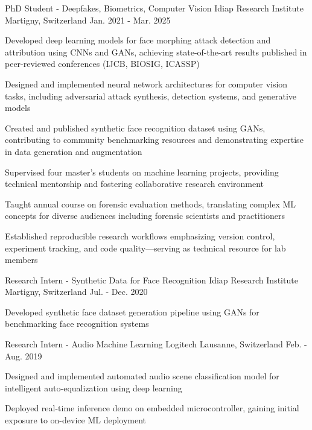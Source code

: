 \begin{cventries}
  \cventry
    {PhD Student - Deepfakes, Biometrics, Computer Vision} %
    {Idiap Research Institute} %
    {Martigny, Switzerland} %
    {Jan. 2021 - Mar. 2025} %
    {
      \begin{cvitems} %
        \item {Developed deep learning models for face morphing attack detection and attribution using CNNs and GANs, achieving state-of-the-art results published in peer-reviewed conferences (IJCB, BIOSIG, ICASSP)}
        \item {Designed and implemented neural network architectures for computer vision tasks, including adversarial attack synthesis, detection systems, and generative models}
        \item {Created and published synthetic face recognition dataset using GANs, contributing to community benchmarking resources and demonstrating expertise in data generation and augmentation}
        \item {Supervised four master's students on machine learning projects, providing technical mentorship and fostering collaborative research environment}
        \item {Taught annual course on forensic evaluation methods, translating complex ML concepts for diverse audiences including forensic scientists and practitioners}
        \item {Established reproducible research workflows emphasizing version control, experiment tracking, and code quality—serving as technical resource for lab members}
      \end{cvitems}
    }

  \cventry
    {Research Intern - Synthetic Data for Face Recognition} %
    {Idiap Research Institute} %
    {Martigny, Switzerland} %
    {Jul. - Dec. 2020} %
    {
      \begin{cvitems} %
        \item {Developed synthetic face dataset generation pipeline using GANs for benchmarking face recognition systems}
      \end{cvitems}
    }

  \cventry
    {Research Intern - Audio Machine Learning} %
    {Logitech} %
    {Lausanne, Switzerland} %
    {Feb. - Aug. 2019} %
    {
      \begin{cvitems} %
        \item {Designed and implemented automated audio scene classification model for intelligent auto-equalization using deep learning}
        \item {Deployed real-time inference demo on embedded microcontroller, gaining initial exposure to on-device ML deployment}
      \end{cvitems}
    }

\end{cventries}
